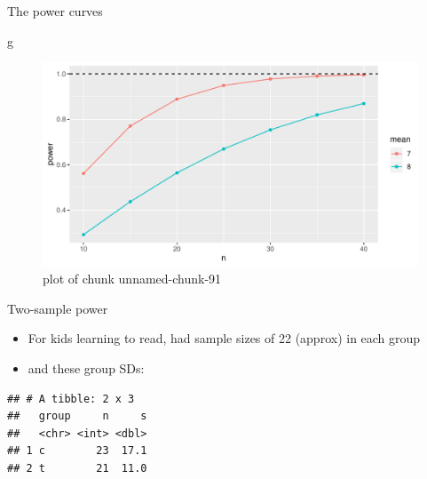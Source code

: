 \documentclass[ignorenonframetext,]{beamer}
\newenvironment{Shaded}{\begin{snugshade}}{\end{snugshade}}
\newcommand{\DataTypeTok}[1]{\textcolor[rgb]{0.13,0.29,0.53}{#1}}
\newcommand{\KeywordTok}[1]{\textcolor[rgb]{0.13,0.29,0.53}{\textbf{#1}}}
\newcommand{\NormalTok}[1]{#1}
\newcommand{\OperatorTok}[1]{\textcolor[rgb]{0.81,0.36,0.00}{\textbf{#1}}}
\newcommand{\StringTok}[1]{\textcolor[rgb]{0.31,0.60,0.02}{#1}}
\providecommand{\tightlist}{%
  \setlength{\itemsep}{0pt}\setlength{\parskip}{0pt}}
\begin{document}
\begin{frame}[fragile]{The power curves}
\protect\hypertarget{the-power-curves-1}{}

\begin{Shaded}
\begin{Highlighting}[]
\NormalTok{g}
\end{Highlighting}
\end{Shaded}

\begin{figure}
\centering
\includegraphics{figure/unnamed-chunk-91-1.pdf}
\caption{plot of chunk unnamed-chunk-91}
\end{figure}

\end{frame}

\begin{frame}[fragile]{Two-sample power}
\protect\hypertarget{two-sample-power}{}

\begin{itemize}
\tightlist
\item
  For kids learning to read, had sample sizes of 22 (approx) in each
  group
\item
  and these group SDs:
\end{itemize}

\begin{Shaded}
\end{Shaded}

\begin{verbatim}
## # A tibble: 2 x 3
##   group     n     s
##   <chr> <int> <dbl>
## 1 c        23  17.1
## 2 t        21  11.0
\end{verbatim}

\end{frame}
\end{document}
